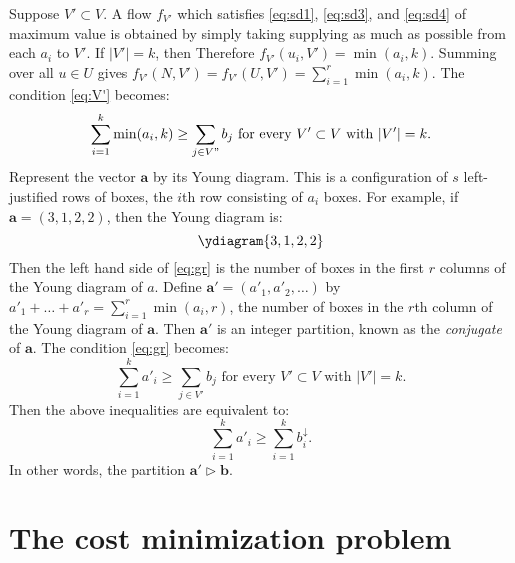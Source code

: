 \documentclass{amsbook}
\newcommand{\bb}{\mathbf b}
\renewcommand{\aa}{\mathbf a}
\theoremstyle{definition}
\theoremstyle{remark}
\begin{document}
Suppose $V'\subset V$.
A flow $f_{V'}$ which satisfies \eqref{eq:sd1}, \eqref{eq:sd3}, and \eqref{eq:sd4} of maximum value is obtained by simply taking supplying as much as possible from each $a_i$ to $V'$.
If $|V'|=k$, then
Therefore $f_{V'}(u_i,V')=\min(a_i,k)$.
Summing over all $u\in U$ gives $f_{V'}(N,V')=f_{V'}(U,V')=\sum_{i=1}^r\min(a_i,k)$.
The condition \eqref{eq:V'} becomes:
\begin{equation}
  \label{eq:gr}
  \sum_{i=1}^k \min(a_i,k)\geq \sum_{j\in V"} b_j \text{ for every } V'\subset V \text{ with } |V'|=k.
\end{equation}
Represent the vector $\aa$ by its Young diagram.
This is a configuration of $s$ left-justified rows of boxes, the $i$th row consisting of $a_i$ boxes.
For example, if $\aa=(3,1,2,2)$, then the Young diagram is:
\begin{displaymath}
  \ydiagram{3,1,2,2}
\end{displaymath}
Then the left hand side of \eqref{eq:gr} is the number of boxes in the first $r$ columns of the Young diagram of $a$.
Define $\aa'=(a'_1,a'_2,\dotsc)$ by $a'_1+\dotsc + a'_r=\sum_{i=1}^r \min(a_i,r)$, the number of boxes in the $r$th column of the Young diagram of $\aa$.
Then $\aa'$ is an integer partition, known as the \emph{conjugate} of $\aa$.
The condition \eqref{eq:gr} becomes:
\begin{displaymath}
  \sum_{i=1}^k a'_i \geq \sum_{j\in V'}b_j \text{ for every $V'\subset V$ with $|V'|=k$}.
\end{displaymath}
Then the above inequalities are equivalent to:
\begin{displaymath}
  \sum_{i=1}^k a'_i \geq \sum_{i=1}^k b^{\downarrow}_i.
\end{displaymath}
In other words, the partition $\aa'\rhd \bb$.
\section{The cost minimization problem}
\label{sec:cost-minim-probl}


\end{document}
